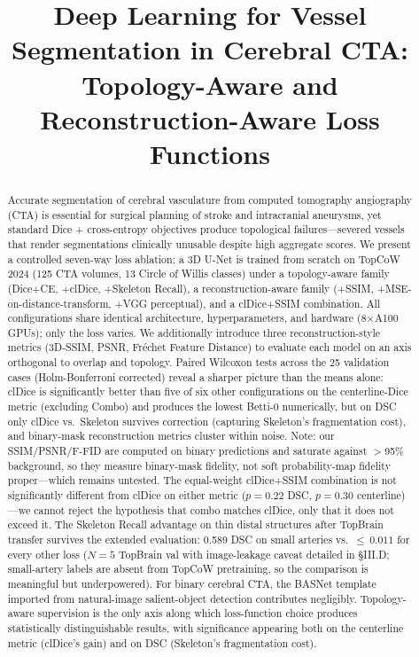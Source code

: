 \documentclass[conference]{IEEEtran}
\begin{document}
\title{Deep Learning for Vessel Segmentation in Cerebral CTA:\\Topology-Aware and Reconstruction-Aware Loss Functions}

\author{
}

\maketitle

\begin{abstract}
Accurate segmentation of cerebral vasculature from computed tomography angiography (CTA) is essential for surgical planning of stroke and intracranial aneurysms, yet standard Dice + cross-entropy objectives produce topological failures---severed vessels that render segmentations clinically unusable despite high aggregate scores. We present a controlled seven-way loss ablation: a 3D U-Net is trained from scratch on TopCoW 2024 (125 CTA volumes, 13 Circle of Willis classes) under a topology-aware family (Dice+CE, +clDice, +Skeleton Recall), a reconstruction-aware family (+SSIM, +MSE-on-distance-transform, +VGG perceptual), and a clDice+SSIM combination. All configurations share identical architecture, hyperparameters, and hardware (8$\times$A100 GPUs); only the loss varies. We additionally introduce three reconstruction-style metrics (3D-SSIM, PSNR, Fr\'{e}chet Feature Distance) to evaluate each model on an axis orthogonal to overlap and topology. Paired Wilcoxon tests across the 25 validation cases (Holm-Bonferroni corrected) reveal a sharper picture than the means alone: clDice is significantly better than five of six other configurations on the centerline-Dice metric (excluding Combo) and produces the lowest Betti-0 numerically, but on DSC only clDice vs.\ Skeleton survives correction (capturing Skeleton's fragmentation cost), and binary-mask reconstruction metrics cluster within noise. Note: our SSIM/PSNR/F-FID are computed on binary predictions and saturate against $>$95\% background, so they measure binary-mask fidelity, not soft probability-map fidelity proper---which remains untested. The equal-weight clDice+SSIM combination is not significantly different from clDice on either metric ($p{=}0.22$ DSC, $p{=}0.30$ centerline)---we cannot reject the hypothesis that combo matches clDice, only that it does not exceed it. The Skeleton Recall advantage on thin distal structures after TopBrain transfer survives the extended evaluation: 0.589 DSC on small arteries vs.\ ${\leq}\,0.011$ for every other loss ($N{=}5$ TopBrain val with image-leakage caveat detailed in §III.D; small-artery labels are absent from TopCoW pretraining, so the comparison is meaningful but underpowered). For binary cerebral CTA, the BASNet template imported from natural-image salient-object detection contributes negligibly. Topology-aware supervision is the only axis along which loss-function choice produces statistically distinguishable results, with significance appearing both on the centerline metric (clDice's gain) and on DSC (Skeleton's fragmentation cost).

\end{abstract}
\end{document}
